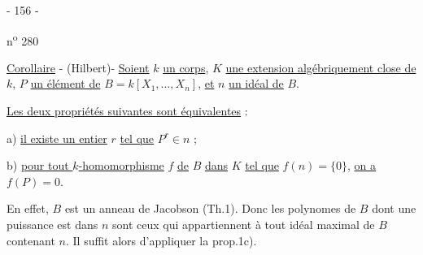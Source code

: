 \begin{center}- 156 -\end{center}
\hfill n\textsuperscript{o} 280

\uline{Corollaire} - (Hilbert)- \uline{Soient} $k$ \uline{un corps},
$K$ \uline{une extension algébriquement close de} $k$,
$P$ \uline{un élément de} $B=k[X_1,\ldots,X_n]$, \uline{et}
$n$ \uline{un idéal de} $B$.

\uline{Les deux propriétés suivantes sont équivalentes} :

a) \uline{il existe un entier} $r$ \uline{tel que} $P^r\in n$ ;

b) \uline{pour tout $k$-homomorphisme} $f$ \uline{de} $B$ \uline{dans} $K$
\uline{tel que} $f(n)=\{0\}$, \uline{on a} $f(P)=0$.

En effet, $B$ est un anneau de Jacobson (Th.1). Donc les polynomes
de $B$ dont une puissance est dans $n$ sont ceux qui appartiennent à tout
idéal maximal de $B$ contenant $n$. Il suffit alors d'appliquer la prop.1c).
